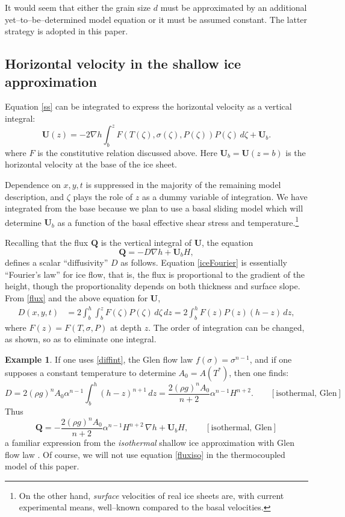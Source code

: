 \documentclass[12pt,final]{amsart}%
\theoremstyle{plain}
\theoremstyle{definition}
\newtheorem*{example}{Example}
\theoremstyle{remark}
\newcommand{\grad}{\nabla}
\newcommand{\bQ}{{\mathbf{Q}}}
\newcommand{\bU}{{\mathbf{U}}}
\begin{document}
It would seem that either the grain size $d$ must be approximated by an additional yet--to--be--determined model equation or it must be assumed constant.  The latter strategy is adopted in this paper.


\subsection*{Horizontal velocity in the shallow ice approximation}\label{ss:horvel}  Equation \eqref{ss} can be integrated to express the horizontal velocity as a vertical integral:
    $$\bU(z) = - 2 \grad h \int_{b}^z F(T(\zeta),\sigma(\zeta),P(\zeta)) P(\zeta)\,d\zeta + \bU_b.$$
where $F$ is the constitutive relation discussed above.  Here $\bU_b=\bU(z=b)$ is the horizontal velocity at the base of the ice sheet.

Dependence on $x,y,t$ is suppressed in the majority of the remaining model description, and $\zeta$ plays the role of $z$ as a dummy variable of integration.  We have integrated from the base because we plan to use a basal sliding model which will determine $\bU_b$ as a function of the basal effective shear stress and temperature.\footnote{On the other hand, \emph{surface} velocities of real ice sheets are, with current experimental means, well--known compared to the basal velocities.}

Recalling that the flux $\bQ$ is the vertical integral of $\bU$, the equation
\begin{equation}\label{iceFourier}
\bQ = - D\grad h + \bU_b H,
\end{equation}
defines a scalar ``diffusivity'' $D$ \citep{vanderVeen} as follows.  Equation \eqref{iceFourier} is essentially ``Fourier's law'' for ice flow, that is, the flux is proportional to the gradient of the height, though the proportionality depends on both thickness and surface slope.  From \eqref{flux} and the above equation for $\bU$,
\begin{align}\label{diffint}
D(x,y,t) &= 2 \int_{b}^h \int_{b}^z F(\zeta) P(\zeta)\,d\zeta\,dz = 2 \int_{b}^h F(z)P(z)(h-z)\,dz,
\end{align}
where $F(z)=F(T,\sigma,P)$ at depth $z$.  The order of integration can be changed, as shown, so as to eliminate one integral.

\begin{example} If one uses \eqref{diffint}, the Glen flow law $f(\sigma)=\sigma^{n-1}$, and if one supposes a constant temperature to determine $A_0=A(T^*)$, then one finds:
    $$D=2(\rho g)^n A_0 \alpha^{n-1} \int_{b}^h (h-z)^{n+1}\,dz=\frac{2(\rho g)^n A_0}{n+2} \alpha^{n-1} H^{n+2}. \qquad [\text{isothermal, Glen}]$$
Thus
\begin{equation}\label{fluxiso}
\bQ=-\frac{2(\rho g)^n A_0}{n+2} \alpha^{n-1} H^{n+2} \, \grad h + \bU_b H, \qquad [\text{isothermal, Glen}]\end{equation}
a familiar expression from the \emph{isothermal} shallow ice approximation with Glen flow law \citep{EISMINT96,Paterson}.  Of course, we will not use equation \eqref{fluxiso} in the thermocoupled model of this paper.\end{example}
\end{document}
